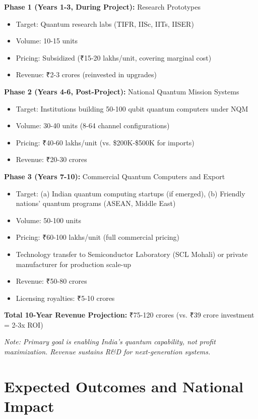 \documentclass[12pt,a4paper]{article}
\begin{document}
\begin{enumerate}[leftmargin=*]
\textbf{Phase 1 (Years 1-3, During Project):} Research Prototypes
\begin{itemize}[leftmargin=*]
    \item Target: Quantum research labs (TIFR, IISc, IITs, IISER)
    \item Volume: 10-15 units
    \item Pricing: Subsidized (₹15-20 lakhs/unit, covering marginal cost)
    \item Revenue: ₹2-3 crores (reinvested in upgrades)
\end{itemize}

\textbf{Phase 2 (Years 4-6, Post-Project):} National Quantum Mission Systems
\begin{itemize}[leftmargin=*]
    \item Target: Institutions building 50-100 qubit quantum computers under NQM
    \item Volume: 30-40 units (8-64 channel configurations)
    \item Pricing: ₹40-60 lakhs/unit (vs. \$200K-\$500K for imports)
    \item Revenue: ₹20-30 crores
\end{itemize}

\textbf{Phase 3 (Years 7-10):} Commercial Quantum Computers and Export
\begin{itemize}[leftmargin=*]
    \item Target: (a) Indian quantum computing startups (if emerged), (b) Friendly nations' quantum programs (ASEAN, Middle East)
    \item Volume: 50-100 units
    \item Pricing: ₹60-100 lakhs/unit (full commercial pricing)
    \item Technology transfer to Semiconductor Laboratory (SCL Mohali) or private manufacturer for production scale-up
    \item Revenue: ₹50-80 crores
    \item Licensing royalties: ₹5-10 crores
\end{itemize}

\textbf{Total 10-Year Revenue Projection:} ₹75-120 crores (vs. ₹39 crore investment = 2-3x ROI)

\textit{Note: Primary goal is enabling India's quantum capability, not profit maximization. Revenue sustains R\&D for next-generation systems.}

\newpage

\section{Expected Outcomes and National Impact}


\end{enumerate}
\end{document}
